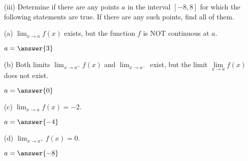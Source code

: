 \documentclass{ximera}
\begin{document}
\begin{exercise}
(iii) Determine if there are any points $a$ in the interval $[-8,8]$ for which the following statements are true. If there are any such points, find all of them.

(a) $\lim_{x\to a} f(x)$ exists, but the function $f$ is NOT continuous at $a$.
\begin{prompt}
\begin{multipleChoice}
\end{multipleChoice}

\begin{exercise}
$a=\answer{3}$
\end{exercise}
\end{prompt}
\end{exercise}

\begin{exercise}
(b) Both limits $\lim_{x\to a^+} f(x)$ and $\lim_{x\to a^-}$ exist, but the limit $\lim\limits_{x\to a} f(x)$ does not exist.

\begin{prompt}
\begin{multipleChoice}
\end{multipleChoice}

\begin{exercise}
$a=\answer{0}$
\end{exercise}
\end{prompt}
\end{exercise}

\begin{exercise}
(c) $\lim_{x\to a} f(x)=-2$.
\begin{prompt}
\begin{multipleChoice}
\end{multipleChoice}

\begin{exercise}
$a=\answer{-4}$
\end{exercise}
\end{prompt}
\end{exercise}

\begin{exercise}
(d) $\lim_{x\to a^+} f(x)=0$.
\begin{prompt}
\begin{multipleChoice}
\end{multipleChoice}

\begin{exercise}
$a=\answer{-8}$
\end{exercise}
\end{prompt}
\end{exercise}
\end{document}
